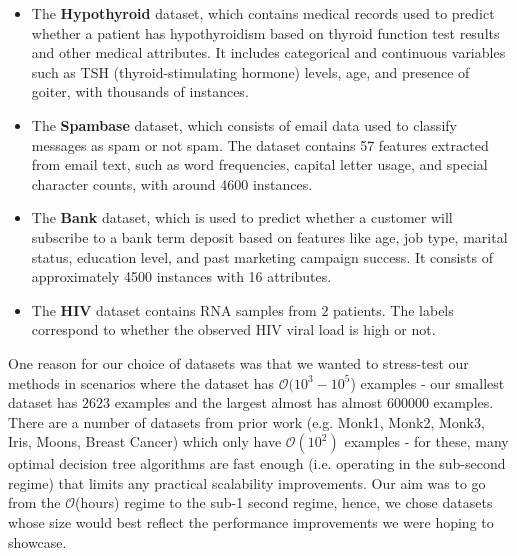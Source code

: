 \begin{itemize}
    \item The \textbf{Hypothyroid} dataset, which contains medical records used to predict whether a patient has hypothyroidism based on thyroid function test results and other medical attributes. It includes categorical and continuous variables such as TSH (thyroid-stimulating hormone) levels, age, and presence of goiter, with thousands of instances.
    \item The \textbf{Spambase} dataset, which consists of email data used to classify messages as spam or not spam. The dataset contains 57 features extracted from email text, such as word frequencies, capital letter usage, and special character counts, with around 4600 instances.
    \item The \textbf{Bank} dataset, which is used to predict whether a customer will subscribe to a bank term deposit based on features like age, job type, marital status, education level, and past marketing campaign success. It consists of approximately 4500 instances with 16 attributes.
    \item The \textbf{HIV} dataset contains RNA samples from $2$ patients. The labels correspond to whether the observed HIV viral load is high or not. 
\end{itemize}
One reason for our choice of datasets was that we wanted to stress-test our methods in scenarios where the dataset has $\mathcal{O}(10^3-10^5$) examples - our smallest dataset has $2623$ examples and the largest almost has almost $600000$ examples. There are a number of datasets from prior work (e.g. Monk1, Monk2, Monk3, Iris, Moons, Breast Cancer) which only have $\mathcal{O}(10^2)$ examples - for these, many optimal decision tree algorithms are fast enough (i.e. operating in the sub-second regime) that limits any practical scalability improvements. Our aim was to go from the $\mathcal{O}$(hours) regime to the sub-1 second regime, hence, we chose datasets whose size would best reflect the performance improvements we were hoping to showcase.
